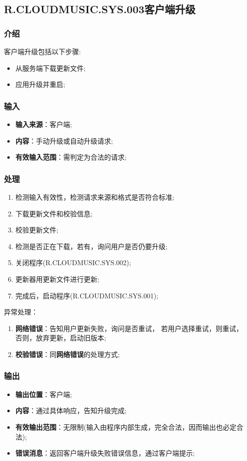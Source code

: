 \subsection{R.CLOUDMUSIC.SYS.003客户端升级}
\subsubsection{介绍}
客户端升级包括以下步骤:
	\begin{itemize}
		\item 从服务端下载更新文件;
		\item 应用升级并重启;
	\end{itemize}
\subsubsection{输入}
	\begin{itemize}
		\item \textbf{输入来源}：客户端;
		\item \textbf{内容}：手动升级或自动升级请求;
		\item \textbf{有效输入范围}：需判定为合法的请求;
	\end{itemize}
\subsubsection{处理}
	\begin{enumerate}
	\item 检测输入有效性，检测请求来源和格式是否符合标准;
  \item 下载更新文件和校验信息;
    \item 校验更新文件;
		\item 检测是否正在下载，若有，询问用户是否仍要升级;
		\item 关闭程序(R.CLOUDMUSIC.SYS.002);
		\item 更新器用更新文件进行更新;
		\item 完成后，启动程序(R.CLOUDMUSIC.SYS.001);
	\end{enumerate}
	\noindent 异常处理：
	\begin{enumerate}
		\item \textbf{网络错误}：告知用户更新失败，询问是否重试，
			若用户选择重试，则重试，否则，放弃更新，启动旧版本;
		\item \textbf{校验错误}：同\textbf{网络错误}的处理方式;
	\end{enumerate}
\subsubsection{输出}
\begin{itemize}
	\item \textbf{输出位置}：客户端;
	\item \textbf{内容}：通过具体响应，告知升级完成;
	\item \textbf{有效输出范围}：无限制(输入由程序内部生成，完全合法，因而输出也必定合法);
	\item \textbf{错误消息}：返回客户端升级失败错误信息，通过客户端提示;
\end{itemize}

